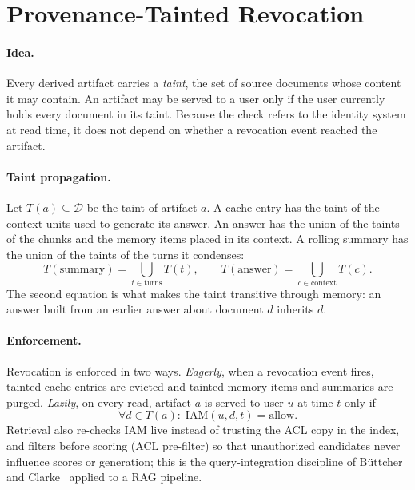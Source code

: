 \section{Provenance-Tainted Revocation}
\label{sec:defense}

\paragraph{Idea.}
Every derived artifact carries a \emph{taint}, the set of source documents whose content it may contain. An artifact may be served to a user only if the user currently holds every document in its taint. Because the check refers to the identity system at read time, it does not depend on whether a revocation event reached the artifact.

\paragraph{Taint propagation.}
Let $T(a)\subseteq\mathcal{D}$ be the taint of artifact $a$. A cache entry has the taint of the context units used to generate its answer. An answer has the union of the taints of the chunks and the memory items placed in its context. A rolling summary has the union of the taints of the turns it condenses:
\begin{equation}
T(\mathrm{summary}) = \bigcup_{t\in\mathrm{turns}} T(t), \qquad
T(\mathrm{answer}) = \bigcup_{c\in\mathrm{context}} T(c).
\end{equation}
The second equation is what makes the taint transitive through memory: an answer built from an earlier answer about document $d$ inherits $d$.

\paragraph{Enforcement.}
Revocation is enforced in two ways. \emph{Eagerly}, when a revocation event fires, tainted cache entries are evicted and tainted memory items and summaries are purged. \emph{Lazily}, on every read, artifact $a$ is served to user $u$ at time $t$ only if
\begin{equation}
\forall d\in T(a):\; \mathrm{IAM}(u,d,t)=\text{allow}.
\label{eq:lazy}
\end{equation}
Retrieval also re-checks IAM live instead of trusting the ACL copy in the index, and filters before scoring (ACL pre-filter) so that unauthorized candidates never influence scores or generation; this is the query-integration discipline of B\"uttcher and Clarke~\cite{buttcher2005security} applied to a RAG pipeline.

